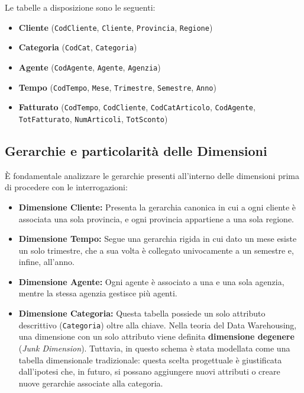 Le tabelle a disposizione sono le seguenti:
\begin{itemize}
    \item \textbf{Cliente} (\texttt{CodCliente}, \texttt{Cliente}, \texttt{Provincia}, \texttt{Regione})
    \item \textbf{Categoria} (\texttt{CodCat}, \texttt{Categoria})
    \item \textbf{Agente} (\texttt{CodAgente}, \texttt{Agente}, \texttt{Agenzia})
    \item \textbf{Tempo} (\texttt{CodTempo}, \texttt{Mese}, \texttt{Trimestre}, \texttt{Semestre}, \texttt{Anno})
    \item \textbf{Fatturato} (\texttt{CodTempo}, \texttt{CodCliente}, \texttt{CodCatArticolo}, \texttt{CodAgente}, \texttt{TotFatturato}, \texttt{NumArticoli}, \texttt{TotSconto})
\end{itemize}

\subsection{Gerarchie e particolarità delle Dimensioni}
È fondamentale analizzare le gerarchie presenti all'interno delle dimensioni prima di procedere con le interrogazioni:
\begin{itemize}
    \item \textbf{Dimensione Cliente:} Presenta la gerarchia canonica in cui a ogni cliente è associata una sola provincia, e ogni provincia appartiene a una sola regione.
    \item \textbf{Dimensione Tempo:} Segue una gerarchia rigida in cui dato un mese esiste un solo trimestre, che a sua volta è collegato univocamente a un semestre e, infine, all'anno.
    \item \textbf{Dimensione Agente:} Ogni agente è associato a una e una sola agenzia, mentre la stessa agenzia gestisce più agenti.
    \item \textbf{Dimensione Categoria:} Questa tabella possiede un solo attributo descrittivo (\texttt{Categoria}) oltre alla chiave. Nella teoria del Data Warehousing, una dimensione con un solo attributo viene definita \textbf{dimensione degenere} (\textit{Junk Dimension}). Tuttavia, in questo schema è stata modellata come una tabella dimensionale tradizionale: questa scelta progettuale è giustificata dall'ipotesi che, in futuro, si possano aggiungere nuovi attributi o creare nuove gerarchie associate alla categoria.
\end{itemize}

